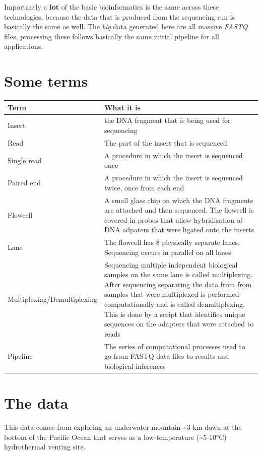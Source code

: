 \documentclass[
]{book}
\begin{document}
Importantly a \textbf{lot} of the basic bioinformatics is the same across these technologies, because the data that is produced from the sequencing run is basically the same as well. The \emph{big} data generated here are all massive \emph{FASTQ} files, processing these follows basically the same initial pipeline for all applications.

\hypertarget{some-terms-1}{%
\section{Some terms}\label{some-terms-1}}

\begin{longtable}{ll}
\toprule
\textbf{Term} & \textbf{What it is}\\
\midrule
Insert & the DNA fragment that is being used for sequencing\\
Read & The part of the insert that is sequenced\\
Single read & A procedure in which the insert is sequenced once\\
Paired end & A procedure in which the insert is sequenced twice, once from each end\\
Flowcell & A small glass chip on which the DNA fragments are attached and then sequenced. The flowcell is covered in probes that allow hybridisation of DNA adpaters that were ligated onto the inserts\\
\addlinespace
Lane & The flowcell has 8 physically separate lanes. Sequencing occurs in parallel on all lanes\\
Multiplexing/Demultiplexing & Sequencing multiple independent biological samples on the same lane is called multiplexing. After sequencing separating the data from from samples that were multiplexed is performed computationally and is called demultiplexing. This is done by a script that identifies unique sequences on the adapters that were attached to reads\\
Pipeline & The series of computational processes used to go from FASTQ data files to results and biological inferences\\
\bottomrule
\end{longtable}

\hypertarget{the-data}{%
\section{The data}\label{the-data}}

This data comes from exploring an underwater mountain \textasciitilde3 km down at the bottom of the Pacific Ocean that serves as a low-temperature (\textasciitilde5-10°C) hydrothermal venting site.
\end{document}

